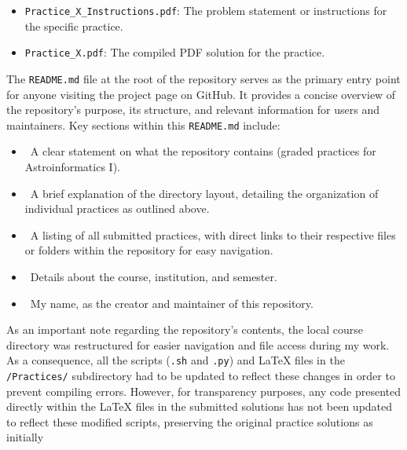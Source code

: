 \documentclass[a4paper,12pt]{article}
\DeclareRobustCommand{\regular}{\fontseries{m}\selectfont}
\DeclareRobustCommand{\sbold}{\fontseries{sb}\selectfont}
\DeclareRobustCommand{\bold}{\fontseries{b}\selectfont}
\newcommand{\bcode}[1]{\texttt{\fontsize{11}{13}\selectfont\bold#1}}
\newenvironment{solution}{}{}
\begin{document}
\begin{enumerate}
\begin{solution}
\begin{itemize}
\begin{itemize}
                    \item \bcode{Practice\_X\_Instructions.pdf}: The problem statement or instructions for the specific practice.
                    \item \bcode{Practice\_X.pdf}: The compiled PDF solution for the practice.
                \end{itemize}
            \end{itemize}
            The \bcode{README.md} file at the root of the repository serves as the
            primary entry point for anyone visiting the project page on GitHub.
            It provides a concise overview of the repository's purpose, its
            structure, and relevant information for users and maintainers. Key
            sections within this \bcode{README.md} include:
            \begin{itemize}
                \item \sbold{Project Purpose:}\regular\ A clear statement on what the repository 
                contains (graded practices for Astroinformatics I).
                \item \sbold{Repository Structure:}\regular\ A brief explanation of the directory
                layout, detailing the organization of individual practices as
                outlined above.
                \item \sbold{Practices:}\regular\ A listing of all submitted practices, with direct
                links to their respective files or folders within the repository
                for easy navigation.
                \item \sbold{Course Information:}\regular\ Details about the course, institution,
                and semester.
                \item \sbold{Author:}\regular\ My name, as the creator and maintainer of this
                repository.
            \end{itemize}
            As an important note regarding the repository's contents, the local
            course directory was restructured for easier navigation and file access
            during my work. As a consequence, all the scripts (\bcode{.sh} and \bcode{.py})
            and \LaTeX{} files in the \bcode{/Practices/} subdirectory had to be updated
            to reflect these changes in order to prevent compiling errors. However,
            for transparency purposes, any code presented directly within the \LaTeX{}
            files in the submitted solutions has not been updated to reflect these
            modified scripts, preserving the original practice solutions as initially

\end{solution}
\end{enumerate}
\end{document}

